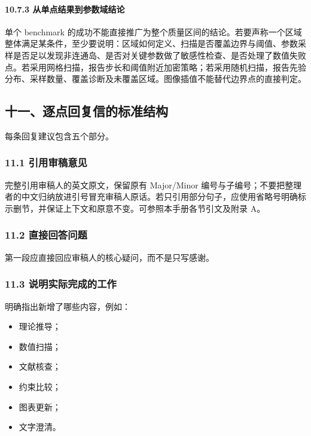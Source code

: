 \documentclass[
  chinese,
  UTF8]{ctexart}
\providecommand{\tightlist}{%
  \setlength{\itemsep}{0pt}\setlength{\parskip}{0pt}}
\begin{document}
\paragraph{10.7.3
从单点结果到参数域结论}\label{ux4eceux5355ux70b9ux7ed3ux679cux5230ux53c2ux6570ux57dfux7ed3ux8bba}

单个 benchmark
的成功不能直接推广为整个质量区间的结论。若要声称一个区域整体满足某条件，至少要说明：区域如何定义、扫描是否覆盖边界与阈值、参数采样是否足以发现非连通岛、是否对关键参数做了敏感性检查、是否处理了数值失败点。若采用网格扫描，报告步长和阈值附近加密策略；若采用随机扫描，报告先验分布、采样数量、覆盖诊断及未覆盖区域。图像插值不能替代边界点的直接判定。

\subsection{十一、逐点回复信的标准结构}\label{ux5341ux4e00ux9010ux70b9ux56deux590dux4fe1ux7684ux6807ux51c6ux7ed3ux6784}

每条回复建议包含五个部分。

\subsubsection{11.1
引用审稿意见}\label{ux5f15ux7528ux5ba1ux7a3fux610fux89c1}

完整引用审稿人的英文原文，保留原有 Major/Minor
编号与子编号；不要把整理者的中文归纳放进引号冒充审稿人原话。若只引用部分句子，应使用省略号明确标示删节，并保证上下文和原意不变。可参照本手册各节引文及附录
A。

\subsubsection{11.2
直接回答问题}\label{ux76f4ux63a5ux56deux7b54ux95eeux9898}

第一段应直接回应审稿人的核心疑问，而不是只写感谢。

\subsubsection{11.3
说明实际完成的工作}\label{ux8bf4ux660eux5b9eux9645ux5b8cux6210ux7684ux5de5ux4f5c}

明确指出新增了哪些内容，例如：

\begin{itemize}
\tightlist
\item
  理论推导；
\item
  数值扫描；
\item
  文献核查；
\item
  约束比较；
\item
  图表更新；
\item
  文字澄清。
\end{itemize}
\end{document}
